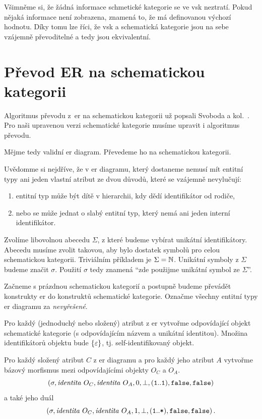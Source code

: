 Všimněme si, že žádná informace schmetické kategorie se ve \acrshort{vsk} neztratí.
Pokud nějaká informace není zobrazena, znamená to, že má definovanou výchozí hodnotu.
Díky tomu lze říci, že \acrshort{vsk} a schematická kategorie jsou na sebe vzájemně převoditelné a tedy jsou ekvivalentní.

\section{Převod ER na schematickou kategorii}

Algoritmus převodu z~\acrshort{er} na schematickou kategorii už popsali Svoboda a kol.~\cite[s.~192-196]{svoboda_categorical_2021}.
Pro naši upravenou verzi schematické kategorie musíme upravit i algoritmus převodu.

Mějme tedy validní \acrshort{er} diagram.
Převedeme ho na schematickou kategorii.

Uvědomme si nejdříve, že v \acrshort{er} diagramu, který dostaneme nemusí mít entitní typy ani jeden vlastní atribut ze dvou důvodů, které se vzájemně nevylučují:
\begin{enumerate}
  \item entitní typ může být dítě v hierarchii, kdy dědí identifikátor od rodiče,
  \item nebo se může jednat o slabý entitní typ, který nemá ani jeden interní identifikátor.
\end{enumerate}

Zvolíme libovolnou abecedu $\Sigma$, z které budeme vybírat unikátní identifikátory.
Abecedu musíme zvolit takovou, aby bylo dostatek symbolů pro celou schematickou kategorii.
Triviálním příkladem je $\Sigma=\mathbb{N}$.
Unikátní symboly z $\Sigma$ budeme značit $\sigma$.
Použití $\sigma$ tedy znamená \enquote{zde použijme unikátní symbol ze $\Sigma$}.

Začneme s prázdnou schematickou kategorií a postupně budeme převádět konstrukty \acrshort{er} do konstruktů schematické kategorie.
Označme všechny entitní typy \acrshort{er} diagramu za \emph{nevyřešené}.

Pro každý (jednoduchý nebo složený) atribut z \acrshort{er} vytvořme odpovídající objekt schematické kategorie (s odpovídajícím názvem a unikátní identitou).
Množina identifikátorů objektu bude $\left\{\varepsilon\right\}$, tj. self-identifikovaný objekt.

Pro každý složený atribut $C$ z \acrshort{er} diagramu a pro každý jeho atribut $A$ vytvořme bázový morfismus mezi odpovídajícími objekty $O_C$ a $O_A$.
$$ (\sigma, \mathit{identita}\ O_C, \mathit{identita}\ O_A, 0, \bot, (\texttt{1}{}..\texttt{1}{}), \texttt{false}, \texttt{false}) $$
a také jeho duál
$$ (\sigma, \mathit{identita}\ O_C, \mathit{identita}\ O_A, 1, \bot, (\texttt{1}{}..\texttt{*}{}), \texttt{false}, \texttt{false})\,. $$

